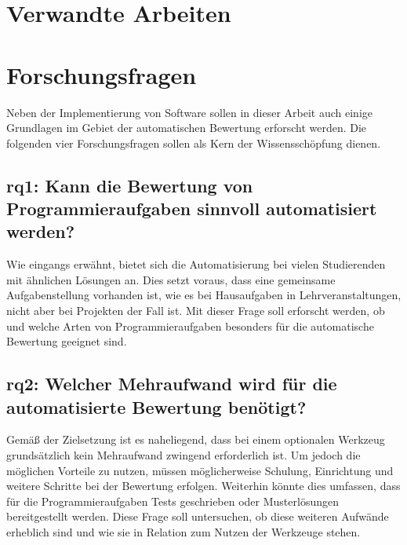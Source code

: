 \section{Verwandte Arbeiten}\label{sec:related-work}


\section{Forschungsfragen}\label{sec:research-questions}

Neben der Implementierung von Software sollen in dieser Arbeit auch einige Grundlagen im Gebiet der automatischen Bewertung erforscht werden.
Die folgenden vier Forschungsfragen sollen als Kern der Wissensschöpfung dienen.

\subsection[\acs{rq}1]{\ac{rq}1: Kann die Bewertung von Programmieraufgaben sinnvoll automatisiert werden?}\label{subsec:rq1-useful-automation}

Wie eingangs erwähnt, bietet sich die Automatisierung bei vielen Studierenden mit ähnlichen Lösungen an.
Dies setzt voraus, dass eine gemeinsame Aufgabenstellung vorhanden ist, wie es bei Hausaufgaben in Lehrveranstaltungen, nicht aber bei Projekten der Fall ist.
Mit dieser Frage soll erforscht werden, ob und welche Arten von Programmieraufgaben besonders für die automatische Bewertung geeignet sind.

\subsection[\acs{rq}2]{\ac{rq}2: Welcher Mehraufwand wird für die automatisierte Bewertung benötigt?}\label{subsec:rq2-additional-effort}

Gemäß der Zielsetzung ist es naheliegend, dass bei einem optionalen Werkzeug grundsätzlich kein Mehraufwand zwingend erforderlich ist.
Um jedoch die möglichen Vorteile zu nutzen, müssen möglicherweise Schulung, Einrichtung und weitere Schritte bei der Bewertung erfolgen.
Weiterhin könnte dies umfassen, dass für die Programmieraufgaben Tests geschrieben oder Musterlösungen bereitgestellt werden.
Diese Frage soll untersuchen, ob diese weiteren Aufwände erheblich sind und wie sie in Relation zum Nutzen der Werkzeuge stehen.


